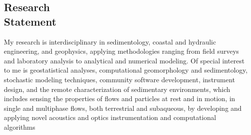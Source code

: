 \documentclass[margin,line]{resume}
\begin{document}
\begin{resume}
\section{\mysidestyle Research\\Statement}
    \begin{footnotesize}
My research is interdisciplinary in sedimentology, coastal and hydraulic engineering, and
geophysics, applying methodologies ranging from field surveys and laboratory analysis to
analytical and numerical modeling. Of special interest to me is geostatistical analyses, computational geomorphology and sedimentology, stochastic modeling techniques, community software development, instrument design, and the remote characterization of
sedimentary environments, which includes sensing the properties of flows and particles at rest
and in motion, in single and multiphase flows, both terrestrial and subaqueous, by developing
and applying novel acoustics and optics instrumentation and computational algorithms


\end{footnotesize}
\end{resume}
\end{document}
